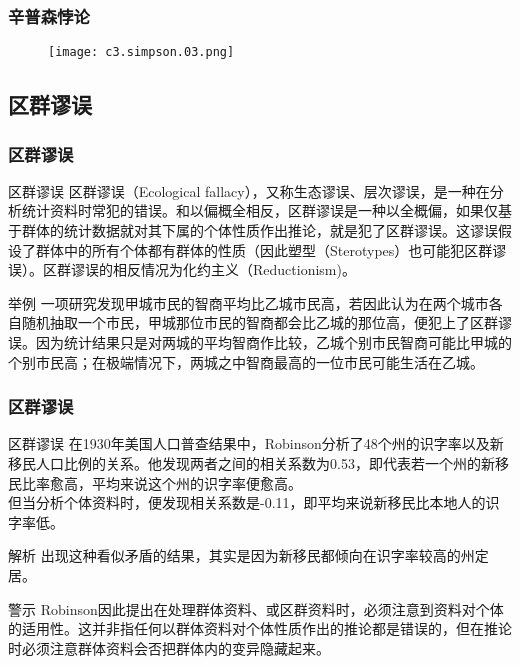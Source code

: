 \begin{frame}
  \frametitle{辛普森悖论}
  \begin{figure}
    \centering
    \texttt{[image: c3.simpson.03.png]}
  \end{figure}
\end{frame}

\subsection{区群谬误}
\begin{frame}
  \frametitle{区群谬误}
  \begin{block}{区群谬误}
    区群谬误（Ecological fallacy），又称生态谬误、层次谬误，是一种在分析统计资料时常犯的错误。和以偏概全相反，区群谬误是一种以全概偏，如果仅基于群体的统计数据就对其下属的个体性质作出推论，就是犯了区群谬误。这谬误假设了群体中的所有个体都有群体的性质（因此塑型（Sterotypes）也可能犯区群谬误）。区群谬误的相反情况为化约主义（Reductionism)。
  \end{block}
  \pause
  \begin{block}{举例}
一项研究发现甲城市民的智商平均比乙城市民高，若因此认为在两个城市各自随机抽取一个市民，甲城那位市民的智商都会比乙城的那位高，便犯上了区群谬误。因为统计结果只是对两城的平均智商作比较，乙城个别市民智商可能比甲城的个别市民高；在极端情况下，两城之中智商最高的一位市民可能生活在乙城。
  \end{block}
\end{frame}

\begin{frame}
  \frametitle{区群谬误}
  \begin{block}{区群谬误}
在1930年美国人口普查结果中，Robinson分析了48个州的识字率以及新移民人口比例的关系。他发现两者之间的相关系数为0.53，即代表若一个州的新移民比率愈高，平均来说这个州的识字率便愈高。\\
\vspace{0.5em}
但当分析个体资料时，便发现相关系数是-0.11，即平均来说新移民比本地人的识字率低。\\
  \end{block}
  \pause \pause \pause \pause
  \begin{block}{解析}
出现这种看似矛盾的结果，其实是因为新移民都倾向在识字率较高的州定居。
  \end{block}
  \pause
  \begin{block}{警示}
Robinson因此提出在处理群体资料、或区群资料时，必须注意到资料对个体的适用性。这并非指任何以群体资料对个体性质作出的推论都是错误的，但在推论时必须注意群体资料会否把群体内的变异隐藏起来。
  \end{block}
\end{frame}

